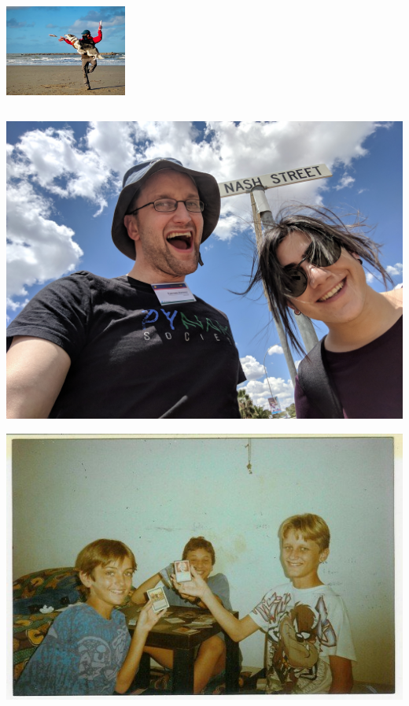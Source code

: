 \documentclass{beamer}
\begin{document}
\begin{frame}
\begin{columns}
\begin{column}{.45\textwidth}
                       \pause
                       \begin{center}
                       \includegraphics[trim={15cm 0 0 0}, clip, height=3cm]{./img/discdog/main.jpg}
                       \end{center}
                   \end{column}
               \end{columns}
    \end{frame}

    \begin{frame}
        \begin{center}
            \includegraphics[width=.7\textwidth]{./img/nik_and_i/main.jpg}
        \end{center}
    \end{frame}

    \begin{frame}
        \begin{center}
            \includegraphics[width=.8\textwidth]{./img/young_me_playing_magic/main.jpg}
        \end{center}

    \end{frame}
\end{document}
